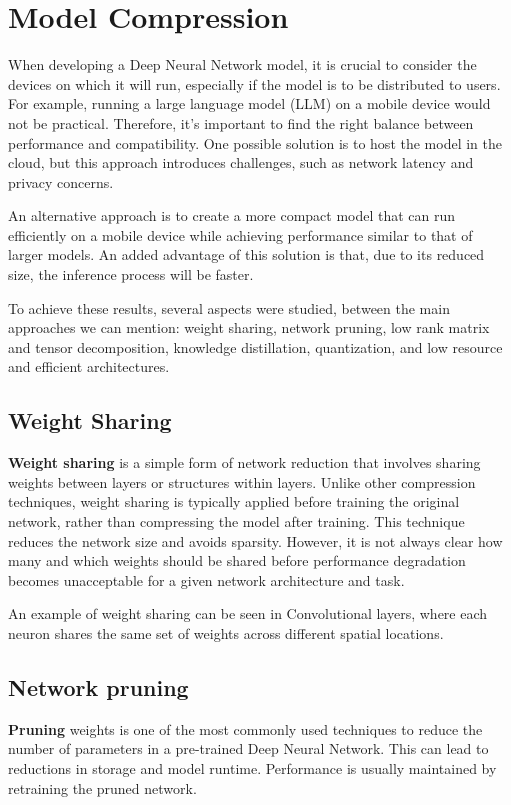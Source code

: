 \chapter{Model Compression}
When developing a Deep Neural Network model, it is crucial to consider the devices
on which it will run, especially if the model is to be distributed to users. For
example, running a large language model (LLM) on a mobile device would not be
practical. Therefore, it's important to find the right balance between performance
and compatibility. One possible solution is to host the model in the cloud, but
this approach introduces challenges, such as network latency and privacy concerns.

An alternative approach is to create a more compact model that can run efficiently
on a mobile device while achieving performance similar to that of larger models.
An added advantage of this solution is that, due to its reduced size, the inference
process will be faster.

To achieve these results, several aspects were studied, between the main approaches
we can mention: weight sharing, network pruning, low rank matrix and tensor decomposition,
knowledge distillation, quantization, and low resource and efficient architectures.

\section{Weight Sharing}
\textbf{Weight sharing} is a simple form of network reduction that involves
sharing weights between layers or structures within layers. Unlike other
compression techniques, weight sharing is typically applied before training the
original network, rather than compressing the model after training. This technique
reduces the network size and avoids sparsity. However, it is not always clear
how many and which weights should be shared before performance degradation becomes
unacceptable for a given network architecture and task.

An example of weight sharing can be seen in Convolutional layers, where each
neuron shares the same set of weights across different spatial locations.

\section{Network pruning}
\textbf{Pruning} weights is one of the most commonly used techniques to reduce
the number of parameters in a pre-trained Deep Neural Network. This can lead to
reductions in storage and model runtime. Performance is usually maintained by
retraining the pruned network.

